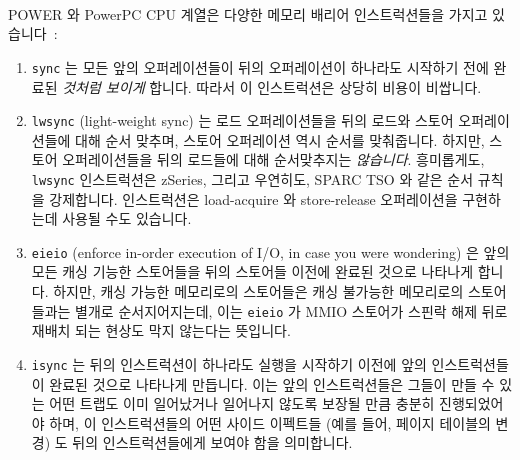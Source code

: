 POWER 와 PowerPC\textsuperscript{\textregistered} CPU 계열은 다양한 메모리
배리어 인스트럭션들을 가지고 있습니다~\cite{PowerPC94,MichaelLyons05a}:
\begin{enumerate}
\item	{\tt sync} 는 모든 앞의 오퍼레이션들이 뒤의 오퍼레이션이 하나라도
	시작하기 전에 완료된 {\em 것처럼 보이게} 합니다.
	따라서 이 인스트럭션은 상당히 비용이 비쌉니다.
\item	{\tt lwsync} (light-weight sync) 는 로드 오퍼레이션들을 뒤의 로드와
	스토어 오퍼레이션들에 대해 순서 맞추며, 스토어 오퍼레이션 역시 순서를
	맞춰줍니다.
	하지만, 스토어 오퍼레이션들을 뒤의 로드들에 대해 순서맞추지는 {\em
	않습니다}.
	흥미롭게도, {\tt lwsync} 인스트럭션은 zSeries, 그리고 우연히도, SPARC
	TSO 와 같은 순서 규칙을 강제합니다.
	 인스트럭션은 load-acquire 와 store-release 오퍼레이션을
	구현하는데 사용될 수도 있습니다.
\item	{\tt eieio} (enforce in-order execution of I/O, in case you were
	wondering) 은 앞의 모든 캐싱 기능한 스토어들을 뒤의 스토어들 이전에
	완료된 것으로 나타나게 합니다.
	하지만, 캐싱 가능한 메모리로의 스토어들은 캐싱 불가능한 메모리로의
	스토어들과는 별개로 순서지어지는데, 이는 {\tt eieio} 가 MMIO 스토어가
	스핀락 해제 뒤로 재배치 되는 현상도 막지 않는다는 뜻입니다.
\item	{\tt isync} 는 뒤의 인스트럭션이 하나라도 실행을 시작하기 이전에 앞의
	인스트럭션들이 완료된 것으로 나타나게 만듭니다.
	이는 앞의 인스트럭션들은 그들이 만들 수 있는 어떤 트랩도 이미
	일어났거나 일어나지 않도록 보장될 만큼 충분히 진행되었어야 하며, 이
	인스트럭션들의 어떤 사이드 이펙트들 (예를 들어, 페이지 테이블의 변경)
	도 뒤의 인스트럭션들에게 보여야 함을 의미합니다.
\end{enumerate}
\iffalse

